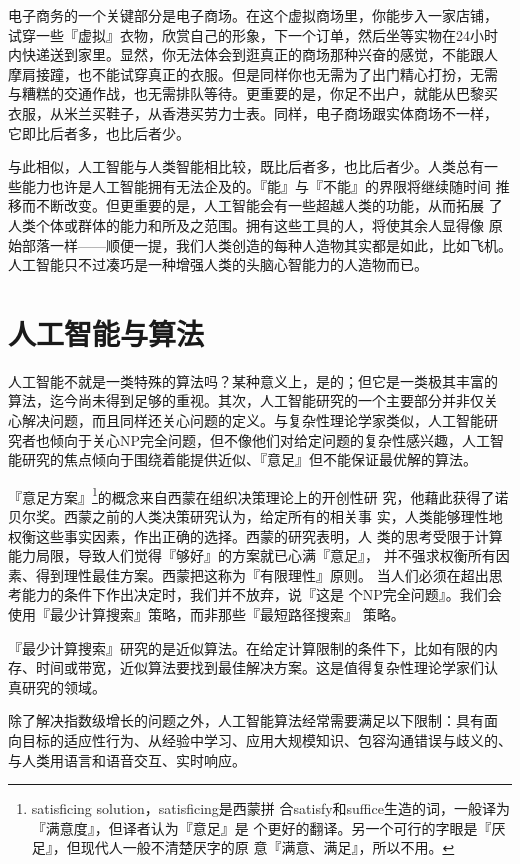 \documentclass[12pt,a4paper]{article}
\begin{document}
电子商务的一个关键部分是电子商场。在这个虚拟商场里，你能步入一家店铺，
试穿一些『虚拟』衣物，欣赏自己的形象，下一个订单，然后坐等实物在24小时
内快递送到家里。显然，你无法体会到逛真正的商场那种兴奋的感觉，不能跟人
摩肩接蹱，也不能试穿真正的衣服。但是同样你也无需为了出门精心打扮，无需
与糟糕的交通作战，也无需排队等待。更重要的是，你足不出户，就能从巴黎买
衣服，从米兰买鞋子，从香港买劳力士表。同样，电子商场跟实体商场不一样，
它即比后者多，也比后者少。

与此相似，人工智能与人类智能相比较，既比后者多，也比后者少。人类总有一
些能力也许是人工智能拥有无法企及的。『能』与『不能』的界限将继续随时间
推移而不断改变。但更重要的是，人工智能会有一些超越人类的功能，从而拓展
了人类个体或群体的能力和所及之范围。拥有这些工具的人，将使其余人显得像
原始部落一样——顺便一提，我们人类创造的每种人造物其实都是如此，比如飞机。
人工智能只不过凑巧是一种增强人类的头脑心智能力的人造物而已。

\section{人工智能与算法}

人工智能不就是一类特殊的算法吗？某种意义上，是的；但它是一类极其丰富的
算法，迄今尚未得到足够的重视。其次，人工智能研究的一个主要部分并非仅关
心解决问题，而且同样还关心问题的定义。与复杂性理论学家类似，人工智能研
究者也倾向于关心NP完全问题，但不像他们对给定问题的复杂性感兴趣，人工智
能研究的焦点倾向于围绕着能提供近似、『意足』但不能保证最优解的算法。

『意足方案』\footnote{satisficing solution，satisficing是西蒙拼
  合satisfy和suffice生造的词，一般译为『满意度』，但译者认为『意足』是
  个更好的翻译。另一个可行的字眼是『厌足』，但现代人一般不清楚厌字的原
  意『满意、满足』，所以不用。}的概念来自西蒙在组织决策理论上的开创性研
究，他藉此获得了诺贝尔奖。西蒙之前的人类决策研究认为，给定所有的相关事
实，人类能够理性地权衡这些事实因素，作出正确的选择。西蒙的研究表明，人
类的思考受限于计算能力局限，导致人们觉得『够好』的方案就已心满『意足』，
并不强求权衡所有因素、得到理性最佳方案。西蒙把这称为『有限理性』原则。
当人们必须在超出思考能力的条件下作出决定时，我们并不放弃，说『这是
个NP完全问题』。我们会使用『最少计算搜索』策略，而非那些『最短路径搜索』
策略。


『最少计算搜索』研究的是近似算法。在给定计算限制的条件下，比如有限的内
存、时间或带宽，近似算法要找到最佳解决方案。这是值得复杂性理论学家们认
真研究的领域。

除了解决指数级增长的问题之外，人工智能算法经常需要满足以下限制：具有面
向目标的适应性行为、从经验中学习、应用大规模知识、包容沟通错误与歧义的、
与人类用语言和语音交互、实时响应。
\end{document}
